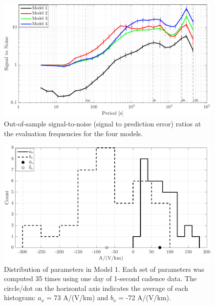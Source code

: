 \documentclass[draft,linenumbers]{agujournal2018}
\begin{document}
\begin{figure}[h]
\centering
\includegraphics[width=\textwidth]{figures/plot_model_summary_SN-options-1.pdf}
\caption{Out-of-sample signal-to-noise (signal to prediction error) ratios at the evaluation frequencies for the four models.}
\label{SN}
\end{figure}

\begin{figure}[h]
\centering
\includegraphics[width=\textwidth]{figures/plot_model_summary_aobo_histograms-options-1.pdf}
\caption{Distribution of parameters in Model 1. Each set of parameters was computed 35 times using one day of 1-second cadence data. The circle/dot on the horizontal axis indicates the average of each histogram: $a_o$ = 73 A/(V/km) and $b_o$ = -72 A/(V/km).}
\label{histogram}
\end{figure}
\end{document}
